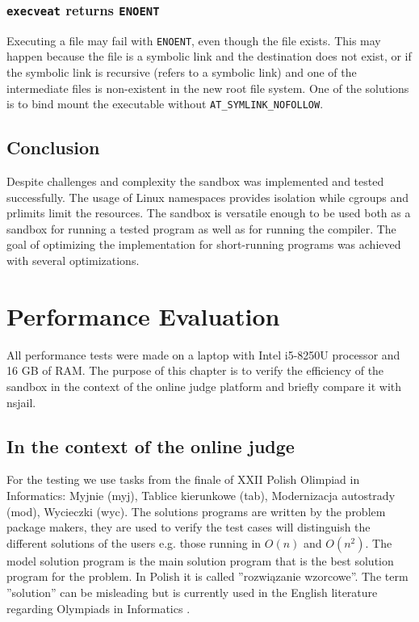 \documentclass[en]{pracamgr}
\begin{document}
\subsection{\texttt{execveat} returns \texttt{ENOENT}} \label{execveat_returns_enoent}

Executing a file may fail with \texttt{ENOENT}, even though the file exists. This may happen because the file is a symbolic link and the destination does not exist, or if the symbolic link is recursive (refers to a symbolic link) and one of the intermediate files is non-existent in the new root file system. One of the solutions is to bind mount the executable without \texttt{AT\_SYMLINK\_NOFOLLOW}.

\section{Conclusion}

Despite challenges and complexity the sandbox was implemented and tested successfully. The usage of Linux namespaces provides isolation while cgroups and prlimits limit the resources. The sandbox is versatile enough to be used both as a sandbox for running a tested program as well as for running the compiler. The goal of optimizing the implementation for short-running programs was achieved with several optimizations.


\chapter{Performance Evaluation}\label{chapter:performance}

All performance tests were made on a laptop with Intel i5-8250U processor and 16 GB of RAM. The purpose of this chapter is to verify the efficiency of the sandbox in the context of the online judge platform and briefly compare it with nsjail.

\section{In the context of the online judge}

For the testing we use tasks from the finale of XXII Polish Olimpiad in Informatics: Myjnie (myj), Tablice kierunkowe (tab), Modernizacja autostrady (mod), Wycieczki (wyc). The solutions programs are written by the problem package makers, they are used to verify the test cases will distinguish the different solutions of the users e.g. those running in $O(n)$ and $O(n^2)$. The model solution program is the main solution program that is the best solution program for the problem. In Polish it is called ''rozwiązanie wzorcowe''. The term ''solution'' can be misleading but is currently used in the English literature regarding Olympiads in Informatics \cite{kolstad2009infrastructure, marevs2012new, merry2010performance, merry2009using}.
\end{document}
